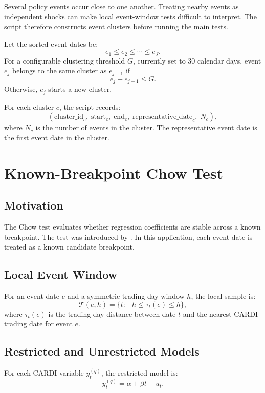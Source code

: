 \documentclass[11pt]{article}
\begin{document}
Several policy events occur close to one another. Treating nearby events as
independent shocks can make local event-window tests difficult to interpret.
The script therefore constructs event clusters before running the main tests.

Let the sorted event dates be:
\[
e_1 \leq e_2 \leq \cdots \leq e_J.
\]
For a configurable clustering threshold \(G\), currently set to 30 calendar
days, event \(e_j\) belongs to the same cluster as \(e_{j-1}\) if
\[
e_j - e_{j-1} \leq G.
\]
Otherwise, \(e_j\) starts a new cluster.

For each cluster \(c\), the script records:
\[
\left(
\text{cluster\_id}_c,\;
\text{start}_c,\;
\text{end}_c,\;
\text{representative\_date}_c,\;
N_c
\right),
\]
where \(N_c\) is the number of events in the cluster. The representative event
date is the first event date in the cluster.

\section{Known-Breakpoint Chow Test}

\subsection{Motivation}

The Chow test evaluates whether regression coefficients are stable across a
known breakpoint. The test was introduced by \citet{chow1960}. In this
application, each event date is treated as a known candidate breakpoint.

\subsection{Local Event Window}

For an event date \(e\) and a symmetric trading-day window \(h\), the local
sample is:
\[
\mathcal{T}(e,h)
= \{t: -h \leq \tau_t(e) \leq h\},
\]
where \(\tau_t(e)\) is the trading-day distance between date \(t\) and the
nearest CARDI trading date for event \(e\).

\subsection{Restricted and Unrestricted Models}

For each CARDI variable \(y_t^{(q)}\), the restricted model is:
\begin{equation}
y_t^{(q)}
= \alpha + \beta t + u_t.
\end{equation}
\end{document}
